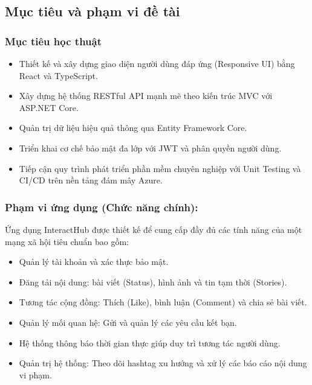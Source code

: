 \documentclass[a4paper]{article}
\begin{document}
    
	\subsection{Mục tiêu và phạm vi đề tài}
        \subsubsection{Mục tiêu học thuật}
	           \begin{itemize}
	               \item Thiết kế và xây dựng giao diện người dùng đáp ứng (Responsive UI) bằng React và TypeScript.
                   \item Xây dựng hệ thống RESTful API mạnh mẽ theo kiến trúc MVC với ASP.NET Core.
                   \item Quản trị dữ liệu hiệu quả thông qua Entity Framework Core.
                   \item Triển khai cơ chế bảo mật đa lớp với JWT và phân quyền người dùng.
                   \item Tiếp cận quy trình phát triển phần mềm chuyên nghiệp với Unit Testing và CI/CD trên nền tảng đám mây Azure.
	           \end{itemize}


        \subsubsection{Phạm vi ứng dụng (Chức năng chính):}
        Ứng dụng InteractHub được thiết kế để cung cấp đầy đủ các tính năng của một mạng xã hội tiêu chuẩn bao gồm:
            \begin{itemize}
                \item Quản lý tài khoản và xác thực bảo mật.
                \item Đăng tải nội dung: bài viết (Status), hình ảnh và tin tạm thời (Stories).
                \item Tương tác cộng đồng: Thích (Like), bình luận (Comment) và chia sẻ bài viết.
                \item Quản lý mối quan hệ: Gửi và quản lý các yêu cầu kết bạn.
                \item Hệ thống thông báo thời gian thực giúp duy trì tương tác người dùng.
                \item Quản trị hệ thống: Theo dõi hashtag xu hướng và xử lý các báo cáo nội dung vi phạm.
            \end{itemize}
        
\end{document}
